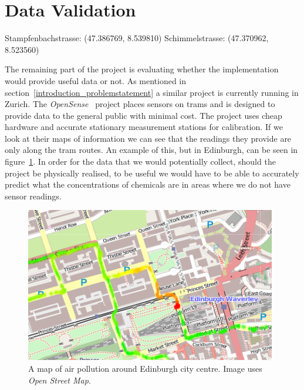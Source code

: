 \section{Data Validation}\label{datavalidation}
	
	Stampfenbachstrasse: (47.386769, 8.539810)
	Schimmelstrasse: (47.370962, 8.523560)

	The remaining part of the project is evaluating whether the implementation would provide useful data or not. As mentioned in section~\ref{introduction_problemstatement} a similar project is currently running in Zurich. The \emph{OpenSense}~\cite{opensensezurich} project places sensors on trams and is designed to provide data to the general public with minimal cost. The project uses cheap hardware and accurate stationary measurement stations for calibration. If we look at their maps of information we can see that the readings they provide are only along the tram routes. An example of this, but in Edinburgh, can be seen in figure~\ref{fig:stationarypollutantbuildup}. In order for the data that we would potentially collect, should the project be physically realised, to be useful we would have to be able to accurately predict what the concentrations of chemicals are in areas where we do not have sensor readings. 

	\begin{figure}[H]
	    \begin{center}
	        \includegraphics[width=\textwidth]{./images/StationaryPollutantBuildUp.png}
	        \caption{A map of air pollution around Edinburgh city centre. Image uses \emph{Open Street Map}.}
	        \label{fig:stationarypollutantbuildup}
	    \end{center}
	\end{figure}

